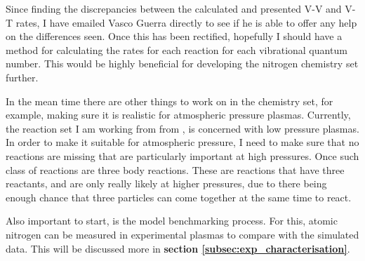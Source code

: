 \documentclass[11pt, oneside]{article}   	%
\newcommand{\todo}[1]{ \textcolor{red}{\bf{To Do:} #1}}
\begin{document}
Since finding the discrepancies between the calculated and presented V-V and V-T rates, I have emailed Vasco Guerra directly to see if he is able to offer any help on the differences seen.
Once this has been rectified, hopefully I should have a method for calculating the rates for each reaction for each vibrational quantum number.
This would be highly beneficial for developing the nitrogen chemistry set further.

In the mean time there are other things to work on in the chemistry set, for example, making sure it is realistic for atmospheric pressure plasmas.
Currently, the reaction set I am working from from \cite{Kutasi2016tuning}, is concerned with low pressure plasmas.
In order to make it suitable for atmospheric pressure, I need to make sure that no reactions are missing that are particularly important at high pressures.
Once such class of reactions are three body reactions.
These are reactions that have three reactants, and are only really likely at higher pressures, due to there being enough chance that three particles can come together at the same time to react. 

Also important to start, is the model benchmarking process.
For this, atomic nitrogen can be measured in experimental plasmas to compare with the simulated data.
This will be discussed more in \textbf{section \ref{subsec:exp_characterisation}}.



\end{document}
